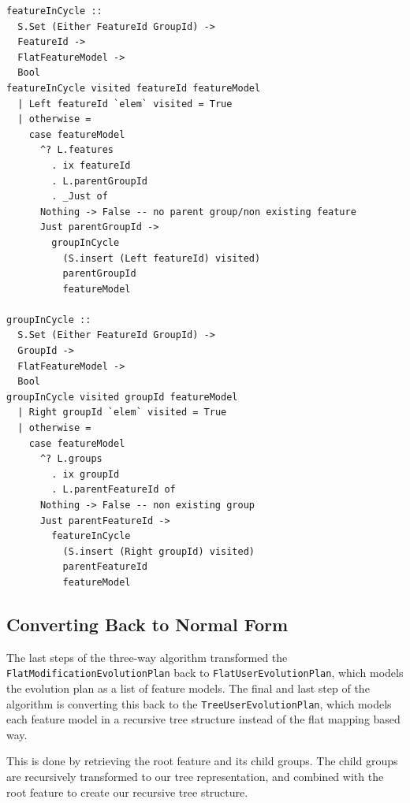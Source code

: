 \documentclass[a4paper,english]{ifimaster}
\begin{document}
\begin{verbatim}
featureInCycle ::
  S.Set (Either FeatureId GroupId) ->
  FeatureId ->
  FlatFeatureModel ->
  Bool
featureInCycle visited featureId featureModel
  | Left featureId `elem` visited = True
  | otherwise =
    case featureModel
      ^? L.features
        . ix featureId
        . L.parentGroupId
        . _Just of
      Nothing -> False -- no parent group/non existing feature
      Just parentGroupId ->
        groupInCycle
          (S.insert (Left featureId) visited)
          parentGroupId
          featureModel

groupInCycle ::
  S.Set (Either FeatureId GroupId) ->
  GroupId ->
  FlatFeatureModel ->
  Bool
groupInCycle visited groupId featureModel
  | Right groupId `elem` visited = True
  | otherwise =
    case featureModel
      ^? L.groups
        . ix groupId
        . L.parentFeatureId of
      Nothing -> False -- non existing group
      Just parentFeatureId ->
        featureInCycle
          (S.insert (Right groupId) visited)
          parentFeatureId
          featureModel
\end{verbatim}

\subsection{Converting Back to Normal Form}%
\label{sub:converting_back_to_normal_form}

The last steps of the three-way algorithm transformed the \texttt{Flat\-Modification\-Evolution\-Plan} back to \texttt{Flat\-User\-Evolution\-Plan}, which models the evolution plan as a list of feature models. The final and last step of the algorithm is converting this back to the \texttt{Tree\-User\-Evolution\-Plan}, which models each feature model in a recursive tree structure instead of the flat mapping based way.

This is done by retrieving the root feature and its child groups. The child groups are recursively transformed to our tree representation, and combined with the root feature to create our recursive tree structure.
\end{document}
